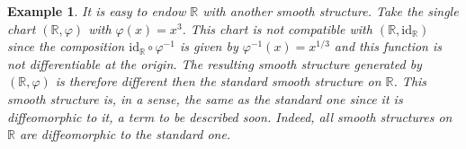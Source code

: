 \documentclass{article}
\theoremstyle{plain}
\theoremstyle{normal}
\newtheorem{example}{Example}[section]
\begin{document}
        \begin{example}
            It is easy to endow $\mathbb{R}$ with another smooth structure. Take
            the single chart $(\mathbb{R},\varphi)$ with $\varphi(x)=x^{3}$.
            This chart is not compatible with
            $(\mathbb{R},\textrm{id}_{\mathbb{R}})$ since the composition
            $\textrm{id}_{\mathbb{R}}\circ\varphi^{-1}$ is given by
            $\varphi^{-1}(x)=x^{1/3}$ and this function is not differentiable
            at the origin. The resulting smooth structure generated by
            $(\mathbb{R},\varphi)$ is therefore different then the standard
            smooth structure on $\mathbb{R}$. This smooth structure is, in a
            sense, \textit{the same} as the standard one since it is
            \textit{diffeomorphic} to it, a term to be described soon.
            Indeed, all smooth structures on $\mathbb{R}$ are diffeomorphic to
            the standard one.
        \end{example}
\end{document}
